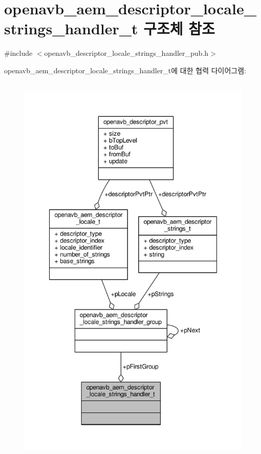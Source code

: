 \hypertarget{structopenavb__aem__descriptor__locale__strings__handler__t}{}\section{openavb\+\_\+aem\+\_\+descriptor\+\_\+locale\+\_\+strings\+\_\+handler\+\_\+t 구조체 참조}
\label{structopenavb__aem__descriptor__locale__strings__handler__t}


{\ttfamily \#include $<$openavb\+\_\+descriptor\+\_\+locale\+\_\+strings\+\_\+handler\+\_\+pub.\+h$>$}



openavb\+\_\+aem\+\_\+descriptor\+\_\+locale\+\_\+strings\+\_\+handler\+\_\+t에 대한 협력 다이어그램\+:
\nopagebreak
\begin{figure}[H]
\begin{center}
\leavevmode
\includegraphics[height=550pt]{structopenavb__aem__descriptor__locale__strings__handler__t__coll__graph}
\end{center}
\end{figure}
